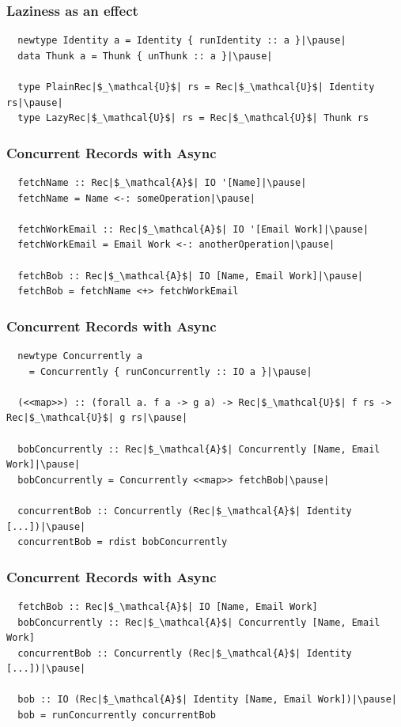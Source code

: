 \documentclass[12pt]{beamer}
\begin{document}
\begin{frame}[fragile]
  \frametitle{Laziness as an effect}\pause

  \begin{lstlisting}
  newtype Identity a = Identity { runIdentity :: a }|\pause|
  data Thunk a = Thunk { unThunk :: a }|\pause|

  type PlainRec|$_\mathcal{U}$| rs = Rec|$_\mathcal{U}$| Identity rs|\pause|
  type LazyRec|$_\mathcal{U}$| rs = Rec|$_\mathcal{U}$| Thunk rs
  \end{lstlisting}
\end{frame}

\begin{frame}[fragile]
  \frametitle{Concurrent Records with Async}\pause

  \begin{lstlisting}
  fetchName :: Rec|$_\mathcal{A}$| IO '[Name]|\pause|
  fetchName = Name <-: someOperation|\pause|

  fetchWorkEmail :: Rec|$_\mathcal{A}$| IO '[Email Work]|\pause|
  fetchWorkEmail = Email Work <-: anotherOperation|\pause|

  fetchBob :: Rec|$_\mathcal{A}$| IO [Name, Email Work]|\pause|
  fetchBob = fetchName <+> fetchWorkEmail
  \end{lstlisting}
\end{frame}

\begin{frame}[fragile]
  \frametitle{Concurrent Records with Async}\pause

  \begin{lstlisting}
  newtype Concurrently a
    = Concurrently { runConcurrently :: IO a }|\pause|

  (<<map>>) :: (forall a. f a -> g a) -> Rec|$_\mathcal{U}$| f rs -> Rec|$_\mathcal{U}$| g rs|\pause|

  bobConcurrently :: Rec|$_\mathcal{A}$| Concurrently [Name, Email Work]|\pause|
  bobConcurrently = Concurrently <<map>> fetchBob|\pause|

  concurrentBob :: Concurrently (Rec|$_\mathcal{A}$| Identity [...])|\pause|
  concurrentBob = rdist bobConcurrently
  \end{lstlisting}
\end{frame}

\begin{frame}[fragile]
  \frametitle{Concurrent Records with Async}\pause

  \begin{lstlisting}
  fetchBob :: Rec|$_\mathcal{A}$| IO [Name, Email Work]
  bobConcurrently :: Rec|$_\mathcal{A}$| Concurrently [Name, Email Work]
  concurrentBob :: Concurrently (Rec|$_\mathcal{A}$| Identity [...])|\pause|

  bob :: IO (Rec|$_\mathcal{A}$| Identity [Name, Email Work])|\pause|
  bob = runConcurrently concurrentBob
  \end{lstlisting}
\end{frame}
\end{document}
